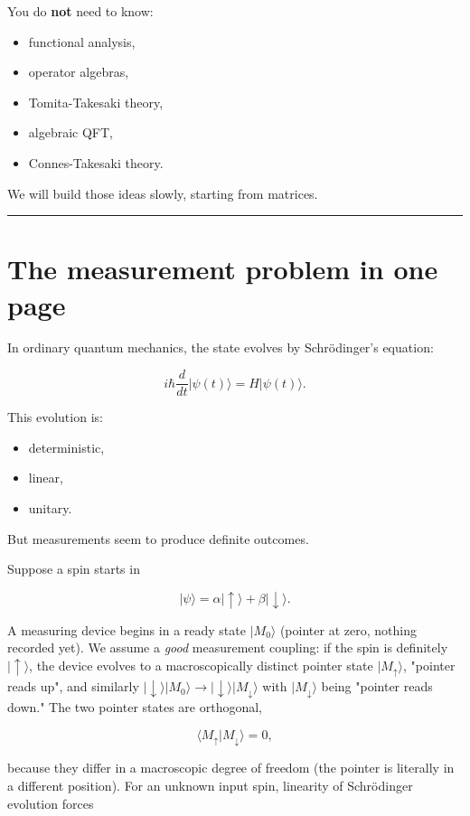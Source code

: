 \documentclass[11pt,a4paper]{article}
\begin{document}
You do \textbf{not} need to know:

\begin{itemize}
  \item functional analysis,
  \item operator algebras,
  \item Tomita-Takesaki theory,
  \item algebraic QFT,
  \item Connes-Takesaki theory.
\end{itemize}

We will build those ideas slowly, starting from matrices.

\medskip\hrule\medskip

\section{The measurement problem in one page}

In ordinary quantum mechanics, the state evolves by Schrödinger’s equation:

\[
i\hbar \frac{d}{dt}|\psi(t)\rangle = H|\psi(t)\rangle.
\]

This evolution is:

\begin{itemize}
  \item deterministic,
  \item linear,
  \item unitary.
\end{itemize}

But measurements seem to produce definite outcomes.

Suppose a spin starts in

\[
|\psi\rangle = \alpha |\uparrow\rangle + \beta |\downarrow\rangle.
\]

A measuring device begins in a ready state $|M_0\rangle$ (pointer at zero, nothing recorded yet). We assume a \emph{good} measurement coupling: if the spin is definitely $|\uparrow\rangle$, the device evolves to a macroscopically distinct pointer state $|M_\uparrow\rangle$, "pointer reads up", and similarly $|\downarrow\rangle|M_0\rangle \longrightarrow |\downarrow\rangle|M_\downarrow\rangle$ with $|M_\downarrow\rangle$ being "pointer reads down." The two pointer states are orthogonal,

\[
\langle M_\uparrow | M_\downarrow \rangle = 0,
\]

because they differ in a macroscopic degree of freedom (the pointer is literally in a different position). For an unknown input spin, linearity of Schrödinger evolution forces
\end{document}
